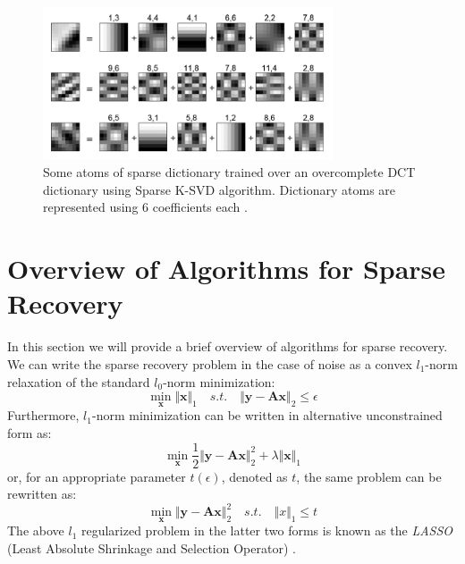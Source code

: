 \documentclass[journal]{IEEEtran}
\begin{document}
\begin{figure}
	\includegraphics[width=8.6cm]{figures/double_sparsity}
	
	\caption{Some atoms of sparse dictionary trained over an overcomplete DCT dictionary using Sparse K-SVD algorithm. Dictionary atoms are represented using 6 coefficients each \cite{Rubinstein2010}.}
	
	\label{fig:double_sparsity}
\end{figure}

\section{Overview of Algorithms for Sparse Recovery} \label{sec:5}

In this section we will provide a brief overview of algorithms for sparse recovery. We can write the sparse recovery problem in the case of noise as a convex $l_1$-norm relaxation of the standard $l_0$-norm minimization:
%
\begin{equation} \label{eq:l0_minimization_noisy}
	\min_{\boldsymbol{x}}\Vert\boldsymbol{x}\Vert_1 \quad s.t. \quad \Vert \boldsymbol{y}-\boldsymbol{A}\boldsymbol{x}\Vert_2\leq \epsilon
\end{equation}
Furthermore, $l_1$-norm minimization can be written in alternative unconstrained form as:
%
\begin{equation} \label{eq:lasso_unconstrained}
	\min_{\boldsymbol{x}}\frac{1}{2}\Vert \boldsymbol{y}-\boldsymbol{A}\boldsymbol{x}\Vert_2^2+\lambda\Vert\boldsymbol{x}\Vert_1
\end{equation}
%
or, for an appropriate parameter $t(\epsilon)$, denoted as $t$, the same problem can be rewritten as:
\begin{equation} \label{eq:lasso_constrained}
	\min_{\boldsymbol{x}} \Vert \boldsymbol{y}-\boldsymbol{A}\boldsymbol{x}\Vert_2^2 \quad s.t. \quad \Vert x\Vert_1 \leq t
\end{equation}
%
The above $l_1$ regularized problem in the latter two forms is known as the \textit{LASSO} (Least Absolute Shrinkage and Selection Operator) \cite{tibshirani1996regression}.
\end{document}
